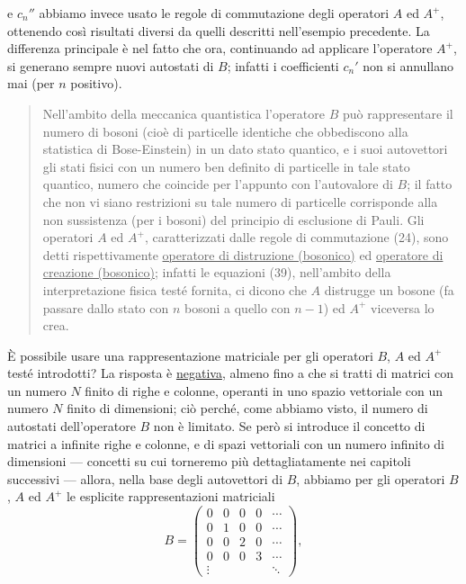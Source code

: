\documentclass[11pt, a4paper]{book}
\numberwithin{equation}{section}
\begin{document}

e $c_n''$ abbiamo invece usato le regole di commutazione degli operatori
$A$ ed $A^+$, ottenendo così risultati diversi da quelli descritti
nell'esempio precedente. La differenza principale è nel fatto che ora,
continuando ad applicare l'operatore $A^+$, si generano sempre nuovi
autostati di $B$; infatti i coefficienti $c_n'$ non si annullano mai (per
$n$ positivo).

\begin{quote}
Nell'ambito della meccanica quantistica l'operatore $B$ può rappresentare
il numero di bosoni (cioè di particelle identiche che obbediscono alla
statistica di Bose-Einstein) in un dato stato quantico, e i suoi
autovettori gli stati fisici con un numero ben definito di particelle in
tale stato quantico, numero che coincide per l'appunto con l'autovalore di
$B$; il fatto che non vi siano restrizioni su tale numero di particelle
corrisponde alla non sussistenza (per i bosoni) del principio di
esclusione di Pauli. Gli operatori $A$ ed $A^+$, caratterizzati dalle
regole di commutazione (24), sono detti rispettivamente
\uline{operatore di distruzione (bosonico)} ed \uline{operatore di
creazione (bosonico)}; infatti le equazioni (39), nell'ambito della
interpretazione fisica testé fornita, ci dicono che $A$ distrugge un
bosone (fa passare dallo stato con $n$ bosoni a quello con $n-1$) ed $A^+$
viceversa lo crea.
\end{quote}

È possibile usare una rappresentazione matriciale per gli operatori $B$,
$A$ ed $A^+$ testé introdotti? La risposta è \uline{negativa}, almeno
fino a che si tratti di matrici con un numero $N$ finito di righe e
colonne, operanti in uno spazio vettoriale con un numero $N$ finito di
dimensioni; ciò perché, come abbiamo visto, il numero di autostati
dell'operatore $B$ non è limitato. Se però si introduce il concetto di
matrici a infinite righe e colonne, e di spazi vettoriali con un numero
infinito di dimensioni --- concetti su cui torneremo più dettagliatamente
nei capitoli successivi --- allora, nella base degli autovettori di $B$,
abbiamo per gli operatori $B$, $A$ ed $A^+$ le esplicite rappresentazioni
matriciali
\begin{equation}
B =
\begin{pmatrix}
0 & 0 & 0 & 0 & \cdots \\
0 & 1 & 0 & 0 & \cdots \\
0 & 0 & 2 & 0 & \cdots \\
0 & 0 & 0 & 3 & \cdots \\
\vdots & & & & \ddots
\end{pmatrix},
\end{equation}
\end{document}
